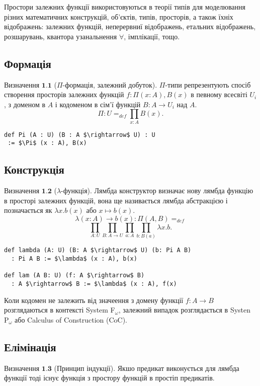\documentclass{article}
\theoremstyle{definition}
\begin{document}
Простори залежних функції використовуються в теорії типів для моделювання різних
математичних конструкцій, об'єктів, типів, просторів, а також їхніх відображень:
залежних функцій, неперервниї відображень, етальних відображень, розшарувань, квантора
узанальнення $\forall$, імплікації, тощо.

 \subsection{Формація}

$\textbf{Визначення\ 1.1}$ ($\Pi$-формація, залежний добуток).
$\Pi$-типи репрезентують спосіб створення просторів залежних функцій  $f: \Pi(x:A), B(x)$ в певному всесвіті $U_i$,
з доменом в $A$ і кодоменом в сім'ї функцій $B : A \rightarrow U_i$ над $A$.
$$
   \Pi : U =_{def} \prod_{x:A}B(x).
$$
\begin{lstlisting}[mathescape=true]
def Pi (A : U) (B : A $\rightarrow$ U) : U
 := $\Pi$ (x : A), B(x)
\end{lstlisting}

\subsection{Конструкція}

$\textbf{Визначення\ 1.2}$ ($\lambda$-функція).
Лямбда конструктор визначає нову лямбда функцію в просторі залежних функцій,
вона ще називається лямбда абстракцією і позначається як $\lambda x. b(x)$ або $x \mapsto b(x)$.
$$
    \lambda (x: A) \rightarrow b(x) : \Pi(A,B) =_{def}
$$
$$
    \prod_{A:U}\prod_{B:A \rightarrow U}\prod_{a: A}\prod_{b:B(a)}\lambda x.b.
$$
\begin{lstlisting}[mathescape=true]
def lambda (A: U) (B: A $\rightarrow$ U) (b: Pi A B)
  : Pi A B := $\lambda$ (x : A), b(x)

def lam (A B: U) (f: A $\rightarrow$ B)
  : A $\rightarrow$ B := $\lambda$ (x : A), f(x)
\end{lstlisting}

Коли кодомен не залежить від значеення з домену функції $f: A \rightarrow B$
розглядаються в контексті System F$_\omega$, залежний випадок розглядається
в  Systen P$_\omega$ або Calculus of Construction (CoC).

\newpage
\subsection{Елімінація}

$\textbf{Визначення\ 1.3}$ (Принцип індукції). Якшо предикат виконується для
лямбда функції тоді існує функція з простору функцій в простіп предикатів.
\end{document}
